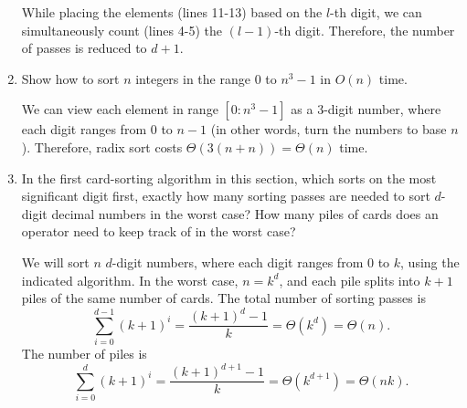 \documentclass[12pt,reqno]{amsart}
\newif\ifanswer
\begin{document}
\begin{enumerate}[1.]
\ifanswer
{}

While placing the elements (lines 11-13) based on the $l$-th digit, we can simultaneously count (lines 4-5) the $(l - 1)$-th digit. Therefore, the number of passes is reduced to $d + 1$.
\vspace{1cm}



\item Show how to sort $n$ integers in the range $0$ to $n^3 - 1$ in $O(n)$ time.
\vspace{0.5cm}

\ifanswer
{}

We can view each element in range $[0:n^3 - 1]$ as a $3$-digit number, where each digit ranges from $0$ to $n - 1$ (in other words, turn the numbers to base $n$). Therefore, radix sort costs $\Theta(3(n + n)) = \Theta(n)$ time.
\vspace{1cm}



\item In the first card-sorting algorithm in this section, which sorts on the most significant digit first, exactly how many sorting passes are needed to sort $d$-digit decimal numbers in the worst case? How many piles of cards does an operator need to keep track of in the worst case?
\vspace{0.5cm}

\ifanswer
{}

We will sort $n$ $d$-digit numbers, where each digit ranges from $0$ to $k$, using the indicated algorithm. In the worst case, $n = k^d$, and each pile splits into $k + 1$ piles of the same number of cards. The total number of sorting passes is $$\sum_{i = 0}^{d - 1}{(k + 1)^i} = \frac{(k + 1)^d - 1}{k} = \Theta(k^d) = \Theta(n).$$ The number of piles is $$\sum_{i = 0}^{d}{(k + 1)^i} = \frac{(k + 1)^{d + 1} - 1}{k} = \Theta(k^{d + 1}) = \Theta(nk).$$
\vspace{1cm}




\end{enumerate}
\end{document}
